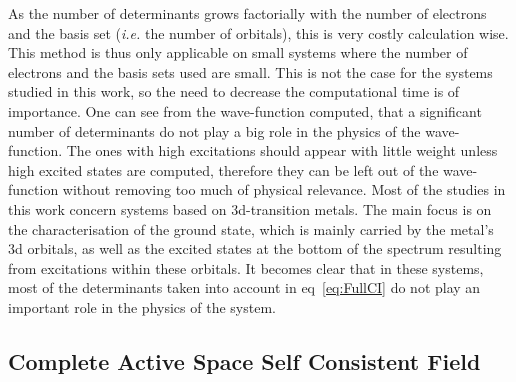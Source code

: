 \documentclass[12pt]{report}
\numberwithin{equation}{section}
\begin{document}
As the number of determinants grows factorially with the number of electrons and the basis set (\textit{i.e.} the number of orbitals), this is very costly calculation wise.
This method is thus only applicable on small systems where the number of electrons and the basis sets used are small.
This is not the case for the systems studied in this work, so the need to decrease the computational time is of importance.
One can see from the wave-function computed, that a significant number of determinants do not play a big role in the physics of the wave-function.
The ones with high excitations should appear with little weight unless high excited states are computed, therefore they can be left out of the wave-function without removing too much of physical relevance. 
Most of the studies in this work concern systems based on 3d-transition metals.
The main focus is on the characterisation of the ground state, which is mainly carried by the metal's 3d orbitals, as well as the excited states at the bottom of the spectrum resulting from excitations within these orbitals.
It becomes clear that in these systems, most of the determinants taken into account in eq~\ref{eq:FullCI} do not play an important role in the physics of the system.



\subsection{Complete Active Space Self Consistent Field}
\end{document}
